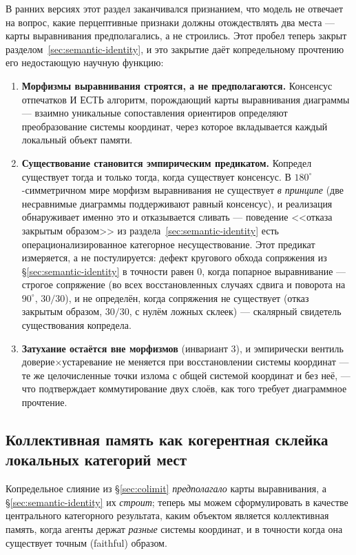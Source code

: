 \documentclass{article}
\begin{document}
В ранних версиях этот раздел заканчивался признанием, что модель не
отвечает на вопрос, какие перцептивные признаки должны отождествлять
два места --- карты выравнивания предполагались, а не строились. Этот
пробел теперь закрыт разделом~\ref{sec:semantic-identity}, и это
закрытие даёт копредельному прочтению его недостающую научную функцию:
\begin{enumerate}[leftmargin=20pt,itemsep=2pt,topsep=2pt]
\item \textbf{Морфизмы выравнивания строятся, а не предполагаются.}
  Консенсус отпечатков И ЕСТЬ алгоритм, порождающий карты выравнивания
  диаграммы --- взаимно уникальные сопоставления ориентиров определяют
  преобразование системы координат, через которое вкладывается каждый
  локальный объект памяти.
\item \textbf{Существование становится эмпирическим предикатом.}
  Копредел существует тогда и только тогда, когда существует
  консенсус. В $180^\circ$-симметричном мире морфизм выравнивания не
  существует \emph{в принципе} (две несравнимые диаграммы
  поддерживают равный консенсус), и реализация обнаруживает именно
  это и отказывается сливать --- поведение <<отказа закрытым образом>>
  из раздела~\ref{sec:semantic-identity} есть операционализированное
  категорное несуществование. Этот предикат измеряется, а не
  постулируется: дефект кругового обхода сопряжения из
  \S\ref{sec:semantic-identity} в точности равен $0$, когда попарное
  выравнивание --- строгое сопряжение (во всех восстановленных
  случаях сдвига и поворота на $90^\circ$, $30/30$), и не определён,
  когда сопряжения не существует (отказ закрытым образом, $30/30$, с
  нулём ложных склеек) --- скалярный свидетель существования
  копредела.
\item \textbf{Затухание остаётся вне морфизмов} (инвариант 3), и
  эмпирически вентиль доверие$\times$устаревание не меняется при
  восстановлении системы координат --- те же целочисленные точки
  излома с общей системой координат и без неё, --- что подтверждает
  коммутирование двух слоёв, как того требует диаграммное прочтение.
\end{enumerate}

\subsection{Коллективная память как когерентная склейка локальных категорий мест}
\label{sec:gluing}

Копредельное слияние из \S\ref{sec:colimit} \emph{предполагало} карты
выравнивания, а \S\ref{sec:semantic-identity} их \emph{строит}; теперь мы можем
сформулировать в качестве центрального категорного результата, каким объектом
является коллективная память, когда агенты держат \emph{разные} системы
координат, и в точности когда она существует точным (faithful) образом.
\end{document}
